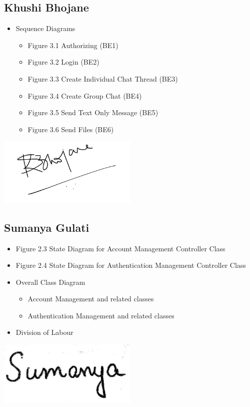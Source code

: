 \documentclass[]{article}
\begin{document}
\subsection{Khushi Bhojane}
\label{subsec:khushi_bhojane}
\begin{itemize}
	\item Sequence Diagrams
	      \begin{itemize}
		      \item Figure 3.1 Authorizing (BE1)
		      \item Figure 3.2 Login (BE2)
		      \item Figure 3.3 Create Individual Chat Thread (BE3)
		      \item Figure 3.4 Create Group Chat (BE4)
		      \item Figure 3.5 Send Text Only Message (BE5)
		      \item Figure 3.6 Send Files (BE6)
	      \end{itemize}
\end{itemize}
\includegraphics[width=0.5\textwidth]{khushi_signature.png}

\subsection{Sumanya Gulati}
\label{subsec:sumanya_gulati}
\begin{itemize}
	\item Figure 2.3 State Diagram for Account Management Controller Class
	\item Figure 2.4 State Diagram for Authentication Management Controller Class
	\item Overall Class Diagram
	      \begin{itemize}
		      \item Account Management and related classes
		      \item Authentication Management and related classes
	      \end{itemize}
	\item Division of Labour
\end{itemize}
\includegraphics[width=0.5\textwidth]{signature.jpeg}
\end{document}
